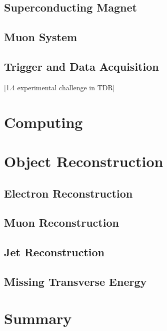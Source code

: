 \subsection{Superconducting Magnet}

\subsection{Muon System}

\subsection{Trigger and Data Acquisition}
[1.4 experimental challenge in TDR]

\section{Computing}

\section{Object Reconstruction}

\subsection{Electron Reconstruction}

\subsection{Muon Reconstruction}

\subsection{Jet Reconstruction}

\subsection{Missing Transverse Energy}

\section{Summary}


